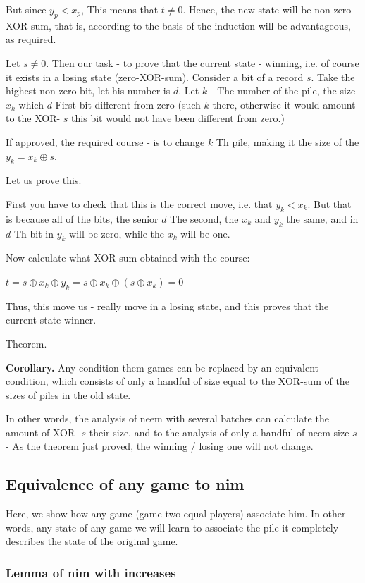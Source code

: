 But since $y_p <x_p$, This means that $t \ne 0$. Hence, the new state will be non-zero XOR-sum, that is, according to the basis of the induction will be advantageous, as required.

Let $s \ne 0$. Then our task - to prove that the current state - winning, i.e. of course it exists in a losing state (zero-XOR-sum).
Consider a bit of a record $s$. Take the highest non-zero bit, let his number is $d$. Let $k$ - The number of the pile, the size $x_k$ which $d$ First bit different from zero (such $k$ there, otherwise it would amount to the XOR- $s$ this bit would not have been different from zero.)

If approved, the required course - is to change $k$ Th pile, making it the size of the $y_k = x_k \oplus s$.

Let us prove this.

First you have to check that this is the correct move, i.e. that $y_k <x_k$. But that is because all of the bits, the senior $d$ The second, the $x_k$ and $y_k$ the same, and in $d$ Th bit in $y_k$ will be zero, while the $x_k$ will be one.

Now calculate what XOR-sum obtained with the course:

$t=s\oplus x_{k}\oplus y_{k}=s\oplus x_{k}\oplus(s\oplus x_{k})=0$

Thus, this move us - really move in a losing state, and this proves that the current state winner.

Theorem.

\textbf{Corollary.} Any condition them games can be replaced by an equivalent condition, which consists of only a handful of size equal to the XOR-sum of the sizes of piles in the old state.

In other words, the analysis of neem with several batches can calculate the amount of XOR- $s$ their size, and to the analysis of only a handful of neem size $s$ - As the theorem just proved, the winning / losing one will not change.

\subsection{ Equivalence of any game to nim }

Here, we show how any game (game two equal players) associate him. In other words, any state of any game we will learn to associate the pile-it completely describes the state of the original game.

\subsubsection{ Lemma of nim with increases }


